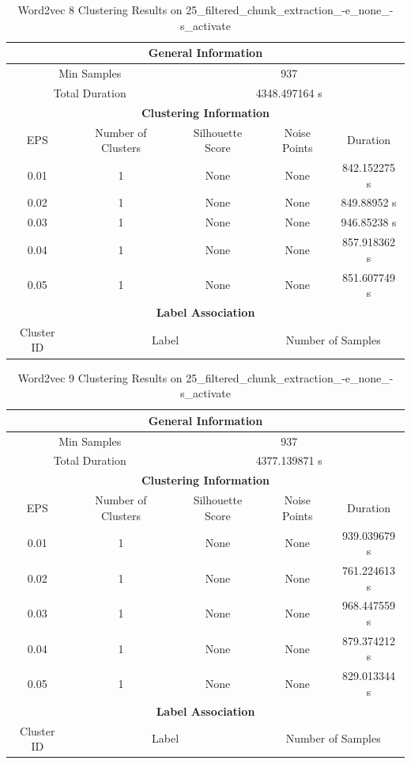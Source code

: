 \begin{longtable}{|c|c|c|c|c|}
\caption{Word2vec 8 Clustering Results on 25\_filtered\_chunk\_extraction\_-e\_none\_-s\_activate} \label{tab:25_filtered_chunk_extraction_-e_none_-s_activate_word2vec_8_clustering_results}\\
\hline
\multicolumn{5}{|c|}{\textbf{General Information}} \\
\hline
\multicolumn{2}{|c|}{Min Samples} & \multicolumn{3}{c|}{937} \\
\multicolumn{2}{|c|}{Total Duration} & \multicolumn{3}{c|}{4348.497164 s} \\
\hline
\multicolumn{5}{|c|}{\textbf{Clustering Information}} \\
\hline
EPS & Number of Clusters & Silhouette Score & Noise Points & Duration \\
0.01 & 1 & None & None & 842.152275 s\\
0.02 & 1 & None & None & 849.88952 s\\
0.03 & 1 & None & None & 946.85238 s\\
0.04 & 1 & None & None & 857.918362 s\\
0.05 & 1 & None & None & 851.607749 s\\
\hline
\multicolumn{5}{|c|}{\textbf{Label Association}} \\
\hline
Cluster ID & \multicolumn{2}{c|}{Label} & \multicolumn{2}{c|}{Number of Samples} \\
\hline
\end{longtable}


\begin{longtable}{|c|c|c|c|c|}
\caption{Word2vec 9 Clustering Results on 25\_filtered\_chunk\_extraction\_-e\_none\_-s\_activate} \label{tab:25_filtered_chunk_extraction_-e_none_-s_activate_word2vec_9_clustering_results}\\
\hline
\multicolumn{5}{|c|}{\textbf{General Information}} \\
\hline
\multicolumn{2}{|c|}{Min Samples} & \multicolumn{3}{c|}{937} \\
\multicolumn{2}{|c|}{Total Duration} & \multicolumn{3}{c|}{4377.139871 s} \\
\hline
\multicolumn{5}{|c|}{\textbf{Clustering Information}} \\
\hline
EPS & Number of Clusters & Silhouette Score & Noise Points & Duration \\
0.01 & 1 & None & None & 939.039679 s\\
0.02 & 1 & None & None & 761.224613 s\\
0.03 & 1 & None & None & 968.447559 s\\
0.04 & 1 & None & None & 879.374212 s\\
0.05 & 1 & None & None & 829.013344 s\\
\hline
\multicolumn{5}{|c|}{\textbf{Label Association}} \\
\hline
Cluster ID & \multicolumn{2}{c|}{Label} & \multicolumn{2}{c|}{Number of Samples} \\
\hline
\end{longtable}


